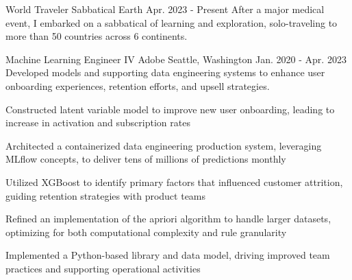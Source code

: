 

\begin{cventries}

\cventry
    {World Traveler} %
    {Sabbatical} %
    {Earth} %
    {Apr. 2023 - Present} %
    {After a major medical event, I embarked on a sabbatical of learning and exploration, solo-traveling to more than 50 countries across 6 continents.} %
    {}

\cventry
    {Machine Learning Engineer IV} %
    {Adobe} %
    {Seattle, Washington} %
    {Jan. 2020 - Apr. 2023} %
    {Developed models and supporting data engineering systems to enhance user onboarding experiences, retention efforts, and upsell strategies.} %
    {
      \begin{cvitems} %
        \item {Constructed latent variable model to improve new user onboarding, leading to increase in activation and subscription rates}
        \item {Architected a containerized data engineering production system, leveraging MLflow concepts, to deliver tens of millions of predictions monthly}
        \item {Utilized XGBoost to identify primary factors that influenced customer attrition, guiding retention strategies with product teams}
        \item {Refined an implementation of the apriori algorithm to handle larger datasets, optimizing for both computational complexity and rule granularity}
        \item {Implemented a Python-based library and data model, driving improved team practices and supporting operational activities}
      \end{cvitems}
    }


\end{cventries}
